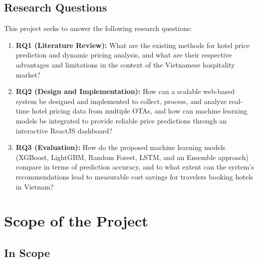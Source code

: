 \documentclass[12pt,a4paper]{report}
\begin{document}
\subsection{Research Questions}

This project seeks to answer the following research questions:

\begin{enumerate}
    \item \textbf{RQ1 (Literature Review):} What are the existing methods for hotel price prediction and dynamic pricing analysis, and what are their respective advantages and limitations in the context of the Vietnamese hospitality market?
    
    \item \textbf{RQ2 (Design and Implementation):} How can a scalable web-based system be designed and implemented to collect, process, and analyze real-time hotel pricing data from multiple OTAs, and how can machine learning models be integrated to provide reliable price predictions through an interactive ReactJS dashboard?
    
    \item \textbf{RQ3 (Evaluation):} How do the proposed machine learning models (XGBoost, LightGBM, Random Forest, LSTM, and an Ensemble approach) compare in terms of prediction accuracy, and to what extent can the system's recommendations lead to measurable cost savings for travelers booking hotels in Vietnam?
\end{enumerate}

\section{Scope of the Project}

\subsection{In Scope}
\end{document}
